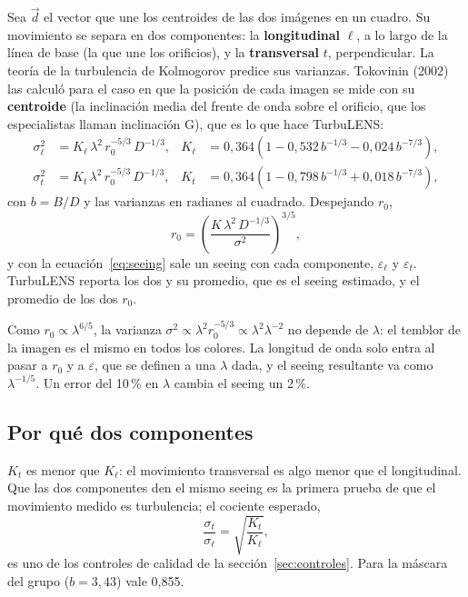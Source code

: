 Sea $\vec d$ el vector que une los centroides de las dos imágenes en un cuadro. Su movimiento se separa en dos
componentes: la \textbf{longitudinal} $\ell$, a lo largo de la línea de base (la que une los orificios), y la
\textbf{transversal} $t$, perpendicular. La teoría de la turbulencia de Kolmogorov predice sus varianzas. Tokovinin
(2002) las calculó para el caso en que la posición de cada imagen se mide con su \textbf{centroide} (la inclinación
media del frente de onda sobre el orificio, que los especialistas llaman inclinación G), que es lo que hace TurbuLENS:
\begin{align}
\sigma_\ell^2 &= K_\ell\,\lambda^2\,r_0^{-5/3}\,D^{-1/3}, &
K_\ell &= 0{,}364\left(1 - 0{,}532\,b^{-1/3} - 0{,}024\,b^{-7/3}\right),\label{eq:kl}\\
\sigma_t^2 &= K_t\,\lambda^2\,r_0^{-5/3}\,D^{-1/3}, &
K_t &= 0{,}364\left(1 - 0{,}798\,b^{-1/3} + 0{,}018\,b^{-7/3}\right),\label{eq:kt}
\end{align}
con $b = B/D$ y las varianzas en radianes al cuadrado. Despejando $r_0$,
\begin{equation}
r_0 = \left(\frac{K\,\lambda^2\,D^{-1/3}}{\sigma^2}\right)^{3/5},
\label{eq:r0dimm}
\end{equation}
y con la ecuación~\eqref{eq:seeing} sale un seeing con cada componente, $\varepsilon_\ell$ y $\varepsilon_t$. TurbuLENS
reporta los dos y su promedio, que es el seeing estimado, y el promedio de los dos $r_0$.

\begin{nota}
Como $r_0 \propto \lambda^{6/5}$, la varianza $\sigma^2 \propto \lambda^2 r_0^{-5/3} \propto \lambda^2 \lambda^{-2}$ no
depende de $\lambda$: el temblor de la imagen es el mismo en todos los colores. La longitud de onda solo entra al pasar a
$r_0$ y a $\varepsilon$, que se definen a una $\lambda$ dada, y el seeing resultante va como $\lambda^{-1/5}$. Un error
del 10\,\% en $\lambda$ cambia el seeing un 2\,\%.
\end{nota}

\subsection{Por qué dos componentes}

$K_t$ es menor que $K_\ell$: el movimiento transversal es algo menor que el longitudinal. Que las dos componentes den el
mismo seeing es la primera prueba de que el movimiento medido es turbulencia; el cociente esperado,
\begin{equation}
\frac{\sigma_t}{\sigma_\ell} = \sqrt{\frac{K_t}{K_\ell}},
\end{equation}
es uno de los controles de calidad de la sección~\ref{sec:controles}. Para la máscara del grupo ($b = 3{,}43$) vale 0,855.

